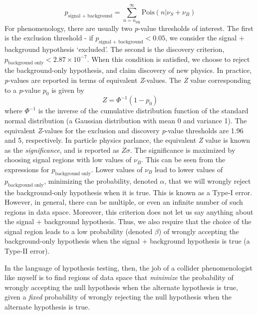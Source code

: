 \[p_\text{signal + background} = \sum_{n=n_\text{SR}}^\infty \text{Pois}(n|\nu_S + \nu_B)\]
For phenomenology, there are usually two \emph{p}-value thresholds of interest. The first is the exclusion threshold - if $p_\text{signal + background} < 0.05$, we consider the signal + background hypothesis `excluded'. The second is the discovery criterion, $p_\text{background only} < 2.87\times 10^{-7}$. When this condition is satisfied, we choose to reject the background-only hypothesis, and claim discovery of new physics. In practice, \emph{p}-values are reported in terms of equivalent \emph{Z}-values. The \emph{Z} value corresponding to a \emph{p}-value $p_0$ is given by
\[Z = \Phi^{-1}(1-p_0)\]
where $\Phi^{-1}$ is the inverse of the cumulative distribution function of the standard normal distribution (a Gaussian distribution with mean 0 and variance 1). The equivalent \emph{Z}-values for the exclusion and discovery \emph{p}-value thresholds are 1.96 and 5, respectively. In particle physics parlance, the equivalent \emph{Z} value is known as the \emph{significance}, and is reported as $Z\sigma$.
The significance is maximized by choosing signal regions with low values of $\nu_B$.
This can be seen from the expressions for $p_\text{background only}$. Lower values of $\nu_B$ lead to lower values of $p_\text{background only}$, minimizing the probability, denoted $\alpha$, that we will wrongly reject the background-only hypothesis when it is true. This is known as a Type-I error. However, in general, there can be multiple, or even an infinite number of such regions in data space. Moreover, this criterion does not let us say anything about the signal + background hypothesis. Thus, we also require that the choice of the signal region leads to a low probability (denoted $\beta$) of wrongly accepting the background-only hypothesis when the signal + background hypothesis is true (a Type-II error).

In the language of hypothesis testing, then, the job of a collider phenomenologist like myself is to find regions of data space that \emph{minimize} the probability of wrongly accepting the null hypothesis when the alternate hypothesis is true, given a \emph{fixed} probability of wrongly rejecting the null hypothesis when the alternate hypothesis is true.

